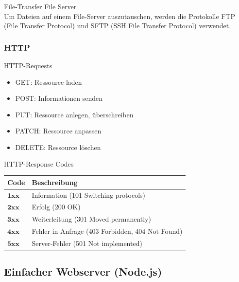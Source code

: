 \begin{definition}
    {File-Transfer} File Server\\
    Um Dateien auf einem File-Server auszutauschen, werden die Protokolle FTP (File Transfer Protocol) und SFTP (SSH File Transfer Protocol) verwendet.
\end{definition}

\subsubsection{HTTP}

\begin{theorem}{HTTP-Requests}
    \begin{itemize}
        \item GET: Ressource laden
        \item POST: Informationen senden
        \item PUT: Ressource anlegen, überschreiben
        \item PATCH: Ressource anpassen
        \item DELETE: Ressource löschen
    \end{itemize}
\end{theorem}

\begin{corollary}{HTTP-Response Codes}
    \begin{center}
    \begin{tabular}{|l|l|}
    \hline
    Code & Beschreibung \\
    \hline
    $\mathbf{1 x x}$ & Information (101 Switching protocols) \\
    \hline
    $\mathbf{2 x x}$ & Erfolg (200 OK) \\
    \hline
    $\mathbf{3 x x}$ & Weiterleitung (301 Moved permanently) \\
    \hline
    $\mathbf{4 x x}$ & Fehler in Anfrage (403 Forbidden, 404 Not Found) \\
    \hline
    $\mathbf{5 x x}$ & Server-Fehler (501 Not implemented) \\
    \hline
    \end{tabular}
    \end{center}
\end{corollary}

\columnbreak

\subsection{Einfacher Webserver (Node.js)}

